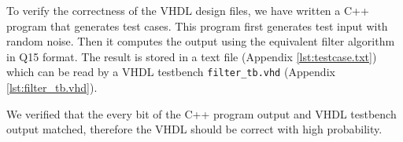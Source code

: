 To verify the correctness of the VHDL design files, we have written a C++ program that generates test cases. This program first generates test input with random noise. Then it computes the output using the equivalent filter algorithm in Q15 format. The result is stored in a text file (Appendix \ref{lst:testcase.txt}) which can be read by a VHDL testbench \texttt{filter\_tb.vhd} (Appendix \ref{lst:filter_tb.vhd}).

We verified that the every bit of the C++ program output and VHDL testbench output matched, therefore the VHDL should be correct with high probability.